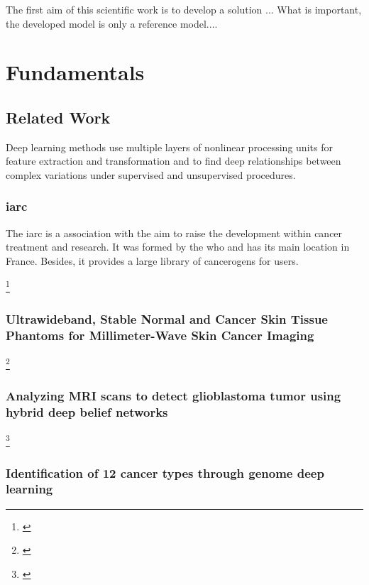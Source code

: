 The first aim of this scientific work is to develop a solution ...
What is important, the developed model is only a reference model....

\chapter{Fundamentals}\label{fundamentals}

\section{Related Work}

Deep learning methods use multiple layers of nonlinear processing units for feature extraction and transformation and to find deep relationships between complex variations under supervised and unsupervised procedures.

\subsection{\ac{iarc}}

The \ac{iarc} is a association with the aim to raise the development within cancer treatment and research. It was formed by the \ac{who} and has its main location in France. Besides, it provides a large library of cancerogens for users.

\footnote{\cite{iarc_world_cancer_report}}

\subsection{Ultrawideband, Stable Normal and Cancer Skin Tissue Phantoms for Millimeter-Wave Skin Cancer Imaging}

\footnote{\cite{8344452}}

\subsection{Analyzing MRI scans to detect glioblastoma tumor using hybrid deep belief networks}

\footnote{\cite{glioblastom_mri}}

\subsection{Identification of 12 cancer types through genome deep learning}

